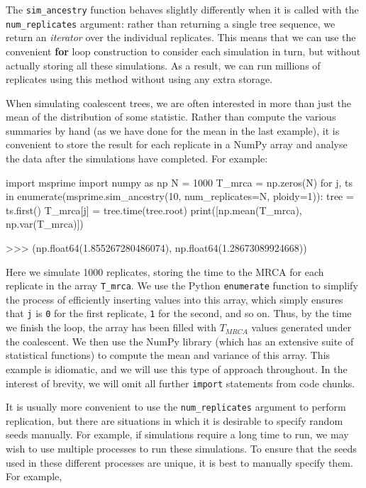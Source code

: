 \documentclass[graybox]{svmult}
\begin{document}
The
\texttt{sim\_ancestry} function behaves slightly differently when it is
called with the \texttt{num\_replicates} argument: rather than returning
a single tree sequence, we return an \emph{iterator} over the individual
replicates. This means that we can use the
convenient \textbf{for} loop construction to consider each simulation in
turn, but without actually storing all these simulations. As a result,
we can run millions of replicates using this method without
using any extra storage.

When simulating coalescent trees, we are often interested in more than
just the mean of the distribution of some statistic. Rather than compute
the various summaries by hand (as we have done for the mean in the last
example), it is convenient to store the result for each
replicate in a NumPy array and analyse the data after the simulations have completed.
For example:

\begin{pythoncode}
import msprime
import numpy as np
N = 1000
T_mrca = np.zeros(N)
for j, ts in enumerate(msprime.sim_ancestry(10,
                                            num_replicates=N,
                                            ploidy=1)):
    tree = ts.first()
    T_mrca[j] = tree.time(tree.root)
print([np.mean(T_mrca), np.var(T_mrca)])

>>> (np.float64(1.855267280486074), np.float64(1.28673089924668))
\end{pythoncode}

    Here we simulate 1000 replicates, storing the time to the MRCA for each replicate in the array \texttt{T\_mrca}.  We use the Python \texttt{enumerate} function to simplify the process of efficiently inserting values into this
array, which simply ensures that \texttt{j} is \texttt{0} for the first replicate,
\texttt{1} for the second, and so on. Thus, by the time we finish the
loop, the array has been filled with $T_{MRCA}$ values generated
under the coalescent. We then use the NumPy library (which has
an extensive suite of statistical functions) to compute the mean and
variance of this array. This example is idiomatic, and we will use this
type of approach throughout. In the interest of brevity, we will omit all
further \texttt{import} statements from code chunks.

It is usually more convenient to use the \texttt{num\_replicates}
argument to perform replication, but there are situations in which it is
desirable to specify random seeds manually. For example, if simulations
require a long time to run, we may wish to use multiple processes to
run these simulations. To ensure that the seeds used in these different
processes are unique, it is best to manually specify them. For example,
\end{document}
